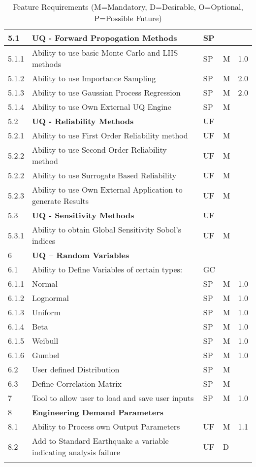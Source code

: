 \begin{longtable}{| p{} | p{} | p{} | p{} |  p{} |}
	5.1 & \textbf{UQ - Forward Propogation Methods} & SP  &  \\ \hline
	5.1.1 & Ability to use basic  Monte Carlo and LHS methods & SP & M & 1.0 \\ \hline
	5.1.2 & Ability to use Importance Sampling  & SP & M & 2.0 \\ \hline
	5.1.3 & Ability to use Gaussian Process Regression & SP & M & 2.0 \\ \hline
	5.1.4 & Ability to use Own External UQ Engine & SP & M &  \\ \hline
	5.2 & \textbf{UQ - Reliability Methods} & UF &  &  \\ \hline
	5.2.1 & Ability to use First Order Reliability method & UF & M &  \\ \hline
	5.2.2 & Ability to use Second Order Reliability method & UF & M & \\ \hline
	5.2.2 & Ability to use Surrogate Based Reliability & UF & M & \\ \hline
	5.2.3 & Ability to use Own External Application to generate Results & UF & M &  \\ \hline
	5.3 & \textbf{UQ - Sensitivity Methods} & UF &  &  \\ \hline
	5.3.1 & Ability to obtain Global Sensitivity Sobol's indices & UF & M &  \\ \hline
    6 & \textbf{UQ – Random Variables} &  &  \\ \hline
    6.1 & Ability to Define Variables of certain types: & GC &  &  \\ 
    6.1.1 &  Normal & SP & M  & 1.0 \\ \hline
    6.1.2 &  Lognormal & SP & M & 1.0 \\ \hline
    6.1.3 & Uniform & SP & M & 1.0  \\ \hline
    6.1.4 & Beta & SP & M & 1.0 \\ \hline
    6.1.5 & Weibull &  SP & M  & 1.0 \\ \hline
    6.1.6 & Gumbel &  SP & M & 1.0  \\ \hline
    6.2 & User defined Distribution & SP & M &  \\ \hline
    6.3 & Define Correlation Matrix & SP & M &  \\ \hline
     7 & Tool to allow user to load and save user inputs & SP & M & 1.0 \\ \hline
    8 & \textbf{Engineering Demand Parameters} &  &  \\ \hline
    8.1 & Ability to Process own Output Parameters & UF & M & 1.1  \\ \hline
    8.2 & Add to Standard Earthquake a variable indicating analysis failure & UF & D &   \\ \hline
	\bottomrule 
\caption{Feature Requirements (M=Mandatory, D=Desirable, O=Optional, P=Possible Future)}             
  \label{tab:featureRequirements}                 
\end{longtable}

